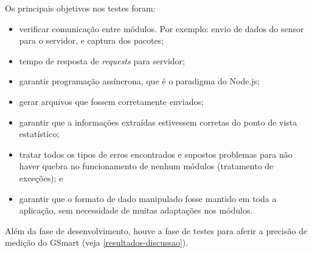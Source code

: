 Os principais objetivos nos testes foram:

\begin{itemize}
  \item verificar comunicação entre módulos. Por exemplo: envio de dados do sensor para o servidor, e captura dos pacotes;
  \item tempo de resposta de \emph{requests} para servidor;
  \item garantir programação assíncrona, que é o paradigma do Node.js;
  \item gerar arquivos que fossem corretamente enviados;
  \item garantir que a informações extraídas estivessem corretas do ponto de vista estatístico;
  \item tratar todos os tipos de erros encontrados e supostos problemas para não haver quebra no funcionamento de nenhum módulos (tratamento de exceções); e
  \item garantir que o formato de dado manipulado fosse mantido em toda a aplicação, sem necessidade de muitas adaptações nos módulos.
\end{itemize}

Além da fase de desenvolvimento, houve a fase de testes para aferir a precisão de medição do GSmart (veja \autoref{resultados-discussao}).
